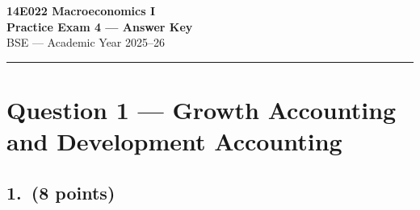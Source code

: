 \documentclass[a4paper,11pt]{article}
\begin{document}

\begin{center}
    {\LARGE \textbf{14E022 Macroeconomics I}}\\[6pt]
    {\Large \textbf{Practice Exam 4 --- Answer Key}}\\[8pt]
    {\large BSE --- Academic Year 2025--26}
\end{center}

\noindent\rule{\textwidth}{0.4pt}

\section{Question 1 --- Growth Accounting and Development Accounting}

\subsection*{1.\ (8 points)}
\end{document}
